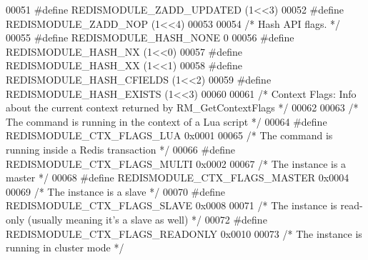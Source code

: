 \begin{DoxyCode}
00051 \textcolor{preprocessor}{#}\textcolor{preprocessor}{define} \textcolor{preprocessor}{REDISMODULE\_ZADD\_UPDATED} \textcolor{preprocessor}{(}1\textcolor{preprocessor}{<<}3\textcolor{preprocessor}{)}
00052 \textcolor{preprocessor}{#}\textcolor{preprocessor}{define} \textcolor{preprocessor}{REDISMODULE\_ZADD\_NOP}     \textcolor{preprocessor}{(}1\textcolor{preprocessor}{<<}4\textcolor{preprocessor}{)}
00053 
00054 \textcolor{comment}{/* Hash API flags. */}
00055 \textcolor{preprocessor}{#}\textcolor{preprocessor}{define} \textcolor{preprocessor}{REDISMODULE\_HASH\_NONE}       0
00056 \textcolor{preprocessor}{#}\textcolor{preprocessor}{define} \textcolor{preprocessor}{REDISMODULE\_HASH\_NX}         \textcolor{preprocessor}{(}1\textcolor{preprocessor}{<<}0\textcolor{preprocessor}{)}
00057 \textcolor{preprocessor}{#}\textcolor{preprocessor}{define} \textcolor{preprocessor}{REDISMODULE\_HASH\_XX}         \textcolor{preprocessor}{(}1\textcolor{preprocessor}{<<}1\textcolor{preprocessor}{)}
00058 \textcolor{preprocessor}{#}\textcolor{preprocessor}{define} \textcolor{preprocessor}{REDISMODULE\_HASH\_CFIELDS}    \textcolor{preprocessor}{(}1\textcolor{preprocessor}{<<}2\textcolor{preprocessor}{)}
00059 \textcolor{preprocessor}{#}\textcolor{preprocessor}{define} \textcolor{preprocessor}{REDISMODULE\_HASH\_EXISTS}     \textcolor{preprocessor}{(}1\textcolor{preprocessor}{<<}3\textcolor{preprocessor}{)}
00060 
00061 \textcolor{comment}{/* Context Flags: Info about the current context returned by RM\_GetContextFlags */}
00062 
00063 \textcolor{comment}{/* The command is running in the context of a Lua script */}
00064 \textcolor{preprocessor}{#}\textcolor{preprocessor}{define} \textcolor{preprocessor}{REDISMODULE\_CTX\_FLAGS\_LUA} 0x0001
00065 \textcolor{comment}{/* The command is running inside a Redis transaction */}
00066 \textcolor{preprocessor}{#}\textcolor{preprocessor}{define} \textcolor{preprocessor}{REDISMODULE\_CTX\_FLAGS\_MULTI} 0x0002
00067 \textcolor{comment}{/* The instance is a master */}
00068 \textcolor{preprocessor}{#}\textcolor{preprocessor}{define} \textcolor{preprocessor}{REDISMODULE\_CTX\_FLAGS\_MASTER} 0x0004
00069 \textcolor{comment}{/* The instance is a slave */}
00070 \textcolor{preprocessor}{#}\textcolor{preprocessor}{define} \textcolor{preprocessor}{REDISMODULE\_CTX\_FLAGS\_SLAVE} 0x0008
00071 \textcolor{comment}{/* The instance is read-only (usually meaning it's a slave as well) */}
00072 \textcolor{preprocessor}{#}\textcolor{preprocessor}{define} \textcolor{preprocessor}{REDISMODULE\_CTX\_FLAGS\_READONLY} 0x0010
00073 \textcolor{comment}{/* The instance is running in cluster mode */}

\end{DoxyCode}
